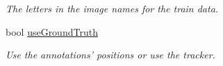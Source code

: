 \begin{DoxyCompactItemize}
\begin{DoxyCompactList}\small\item\em The letters in the image names for the train data. \item\end{DoxyCompactList}\item 
\hypertarget{classclassifyImages_a22a0fec885724c49f9a0ed4f2c46d818}{
bool \hyperlink{classclassifyImages_a22a0fec885724c49f9a0ed4f2c46d818}{useGroundTruth}}
\label{classclassifyImages_a22a0fec885724c49f9a0ed4f2c46d818}

\begin{DoxyCompactList}\small\item\em Use the annotations' positions or use the tracker. \item\end{DoxyCompactList}\end{DoxyCompactItemize}

